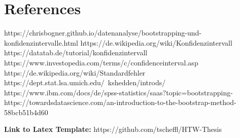 
\chapter{References} \label{References}

https://chrisbogner.github.io/datenanalyse/bootstrapping-und-konfidenzintervalle.html
https://de.wikipedia.org/wiki/Konfidenzintervall
https://datatab.de/tutorial/konfidenzintervall
https://www.investopedia.com/terms/c/confidenceinterval.asp
https://de.wikipedia.org/wiki/Standardfehler
https://dept.stat.lsa.umich.edu/~kshedden/introds/
https://www.ibm.com/docs/de/spss-statistics/saas?topic=bootstrapping-
https://towardsdatascience.com/an-introduction-to-the-bootstrap-method-58bcb51b4d60

\textbf{Link to Latex Template:}
https://github.com/tscheffl/HTW-Thesis


